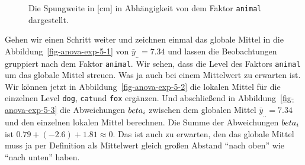 \documentclass[
  letterpaper,
  DIV=11,
  oneside]{scrreport}
\begin{document}
\begin{figure}
\begin{minipage}[t]{0.33\linewidth}
{{}

}

\end{minipage}%

\caption{\label{fig-anova-exp-1}Die Spungweite in {[}cm{]} in
Abhängigkeit von dem Faktor \texttt{animal} dargestellt.}

\end{figure}

Gehen wir einen Schritt weiter und zeichnen einmal das globale Mittel in
die Abbildung~\ref{fig-anova-exp-5-1} von \(\bar{y}_{..} = 7.34\) und
lassen die Beobachtungen gruppiert nach dem Faktor \texttt{animal}. Wir
sehen, dass die Level des Faktors \texttt{animal} um das globale Mittel
streuen. Was ja auch bei einem Mittelwert zu erwarten ist. Wir können
jetzt in Abbildung~\ref{fig-anova-exp-5-2} die lokalen Mittel für die
einzelnen Level \texttt{dog}, \texttt{cat}und \texttt{fox} ergänzen. Und
abschließend in Abbildung~\ref{fig-anova-exp-5-3} die Abweichungen
\(\\beta_i\) zwischen dem globalen Mittel \(\bar{y}_{..} = 7.34\) und
den einzelnen lokalen Mittel berechnen. Die Summe der Abweichungen
\(\\beta_i\) ist \(0.79 + (-2.6) + 1.81 \approx 0\). Das ist auch zu
erwarten, den das globale Mittel muss ja per Definition als Mittelwert
gleich großen Abstand ``nach oben'' wie ``nach unten'' haben.
\end{document}
